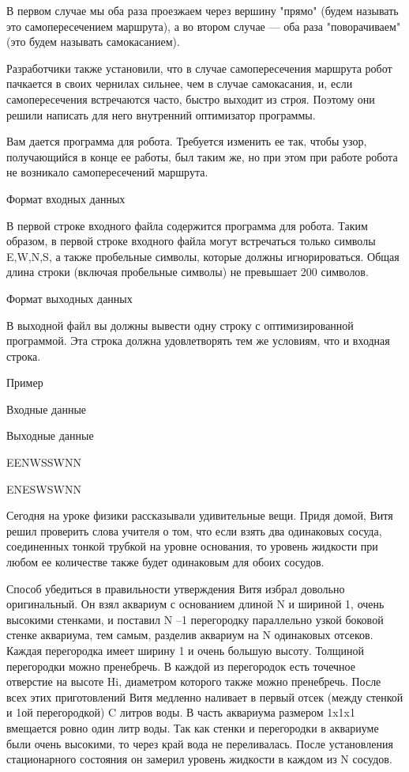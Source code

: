 \documentclass[]{article}
\begin{document}
\begin{enumerate}
В первом случае мы оба раза проезжаем через вершину "прямо" (будем называть это самопересечением маршрута), а во втором случае — оба раза "поворачиваем" (это будем называть самокасанием).

Разработчики также установили, что в случае самопересечения маршрута робот пачкается в своих чернилах сильнее, чем в случае самокасания, и, если самопересечения встречаются часто, быстро выходит из строя. Поэтому они решили написать для него внутренний оптимизатор программы.

Вам дается программа для робота. Требуется изменить ее так, чтобы узор, получающийся в конце ее работы, был таким же, но при этом при работе робота не возникало самопересечений маршрута.

Формат входных данных

В первой строке входного файла содержится программа для робота. Таким образом, в первой строке входного файла могут встречаться только символы E,W,N,S, а также пробельные символы, которые должны игнорироваться. Общая длина строки (включая пробельные символы) не превышает 200 символов.

Формат выходных данных

В выходной файл вы должны вывести одну строку с оптимизированной программой. Эта строка должна удовлетворять тем же условиям, что и входная строка.

Пример

Входные данные
	

Выходные данные

EENWSSWNN
	

ENESWSWNN


Сегодня на уроке физики рассказывали удивительные вещи. Придя домой, Витя решил проверить слова учителя о том, что если взять два одинаковых сосуда, соединенных тонкой трубкой на уровне основания, то уровень жидкости при любом ее количестве также будет одинаковым для обоих сосудов.

Способ убедиться в правильности утверждения Витя избрал довольно оригинальный. Он взял аквариум с основанием длиной N и шириной 1, очень высокими стенками, и поставил N –1 перегородку параллельно узкой боковой стенке аквариума, тем самым, разделив аквариум на N одинаковых отсеков. Каждая перегородка имеет ширину 1 и очень большую высоту. Толщиной перегородки можно пренебречь. В каждой из перегородок есть точечное отверстие на высоте Hi, диаметром которого также можно пренебречь. После всех этих приготовлений Витя медленно наливает в первый отсек (между стенкой и 1ой перегородкой) C литров воды. В часть аквариума размером 1x1x1 вмещается ровно один литр воды. Так как стенки и перегородки в аквариуме были очень высокими, то через край вода не переливалась. После установления стационарного состояния он замерил уровень жидкости в каждом из N сосудов.


\end{enumerate}
\end{document}
